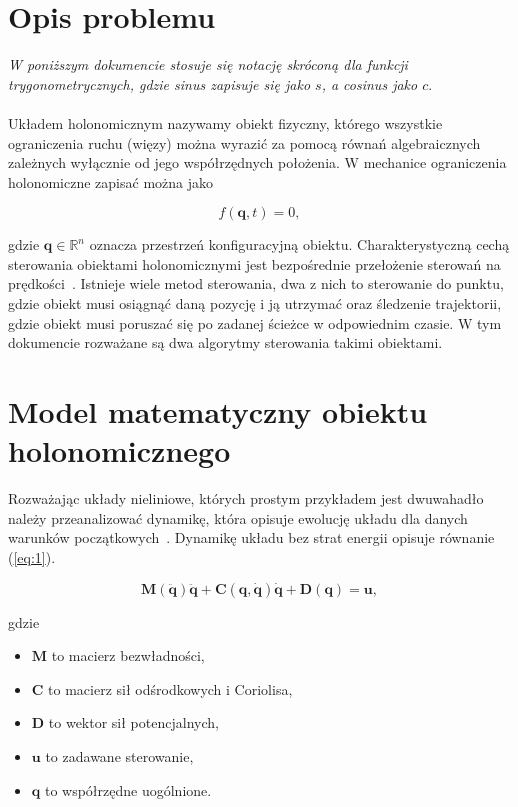 \documentclass[12pt,a4paper]{article}
\newcommand{\mb}[1]{\mathbf{#1}}
\begin{document}
 



\section{Opis problemu}

\emph{W poniższym dokumencie stosuje się notację skróconą dla funkcji trygonometrycznych, gdzie sinus zapisuje się jako $s$, a cosinus jako $c$}.\\
\\
Układem holonomicznym nazywamy obiekt fizyczny, którego wszystkie ograniczenia ruchu (więzy) można wyrazić za pomocą równań algebraicznych zależnych wyłącznie od jego współrzędnych położenia. W mechanice ograniczenia holonomiczne zapisać można jako 

$$f(\mb{q}, t) = 0,$$

gdzie $\mb{q} \in \mathbb{R}^n$ oznacza przestrzeń konfiguracyjną obiektu. Charakterystyczną cechą sterowania obiektami holonomicznymi jest bezpośrednie przełożenie sterowań na prędkości~\cite{Tchon::Robotyka}. Istnieje wiele metod sterowania, dwa z nich to sterowanie do punktu, gdzie obiekt musi osiągnąć daną pozycję i ją utrzymać oraz śledzenie trajektorii, gdzie obiekt musi poruszać się po zadanej ścieżce w odpowiednim czasie. W tym dokumencie rozważane są dwa algorytmy sterowania takimi obiektami.

\section{Model matematyczny obiektu holonomicznego}

Rozważając układy nieliniowe, których prostym przykładem jest dwuwahadło należy przeanalizować dynamikę, która opisuje ewolucję układu dla danych warunków początkowych~\cite{Tchon::MA}. Dynamikę układu bez strat energii opisuje równanie (\ref{eq:1}).

\begin{equation}
    \mathbf{M}(\ddot{\mb{q}})\ddot{\mb{q}} + \mathbf{C}(\mb{q}, \dot{\mb{q}})\dot{\mb{q}} + \mathbf{D}(\mb{q}) = \mb{u},\label{eq:1}
\end{equation}

gdzie

\begin{itemize}
    \item $\mathbf{M}$ to macierz bezwładności,
    \item $\mathbf{C}$ to macierz sił odśrodkowych i Coriolisa,
    \item $\mathbf{D}$ to wektor sił potencjalnych,
    \item $\mb{u}$ to zadawane sterowanie,
    \item $\mb{q}$ to współrzędne uogólnione.
\end{itemize}
\end{document}
